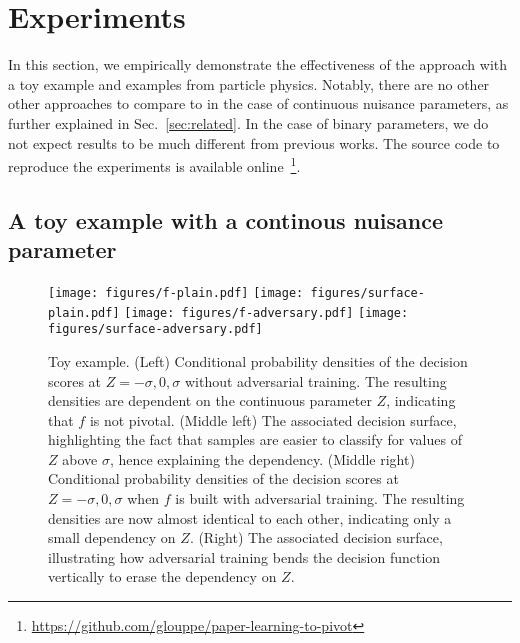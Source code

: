 \documentclass{article}
\theoremstyle{plain}
\begin{document}

\section{Experiments}

In this section, we empirically demonstrate the effectiveness of the approach
with a toy example and examples from particle physics. Notably,
there are no other other approaches to compare to in the case of continuous
nuisance parameters, as further explained in Sec.~\ref{sec:related}. In the case
of binary parameters, we do not expect results to be much different from
previous works. The source code to reproduce the experiments is available online~\footnote{\url{https://github.com/glouppe/paper-learning-to-pivot}}.

\subsection{A toy example with a continous nuisance parameter}
\label{sec:toy}

\begin{figure*}
    \begin{center}
        \texttt{[image: figures/f-plain.pdf]}
        \texttt{[image: figures/surface-plain.pdf]}
        \texttt{[image: figures/f-adversary.pdf]}
        \texttt{[image: figures/surface-adversary.pdf]}
    \end{center}

    \caption{Toy example.
    (Left) Conditional probability densities of the decision scores at $Z=-\sigma, 0, \sigma$
        without adversarial training. The resulting densities
       are dependent on the continuous parameter $Z$, indicating that $f$ is not pivotal.
    (Middle left) The associated decision surface, highlighting
       the fact that samples are easier to classify for values of $Z$ above $\sigma$,
       hence explaining the dependency.
    (Middle right) Conditional probability densities of the decision scores at $Z=-\sigma, 0, \sigma$ when $f$ is
       built with adversarial training.
       The resulting densities are now almost identical to each other, indicating only a
       small dependency on $Z$.
    (Right) The associated decision surface, illustrating how adversarial
       training bends the decision function vertically to erase the dependency on $Z$.
    }
    \label{fig:toy}
\end{figure*}
\end{document}
